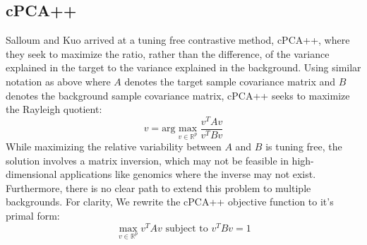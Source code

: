\documentclass[12pt]{article}
\begin{document}
\subsection{cPCA++}
Salloum and Kuo  \cite{Salloum} arrived at a tuning free contrastive method, cPCA++, where they seek to maximize the ratio, rather than the difference, of the variance explained in the target to the variance explained in the background.
Using similar notation as above where $A$ denotes the target sample covariance matrix and $B$ denotes the background sample covariance matrix, cPCA++ seeks to maximize the Rayleigh quotient:
\[v = \text{arg}\max_{v\in \mathbb{R}^p} \frac{v^T A v}{v^T B v}\]
While maximizing the relative variability between $A$ and $B$ is tuning free, the solution involves a matrix inversion, which may not be feasible in high-dimensional applications like genomics where the inverse may not exist. Furthermore, there is no clear path to extend this problem to multiple backgrounds.
For clarity, We rewrite the cPCA++ objective function to it's primal form\cite{ghojogh2019eigenvalue}:
\[\max_{v \in \mathbb{R}^p}{v^T A v}  \mbox{ subject to } v^T B v = 1\]


\end{document}
